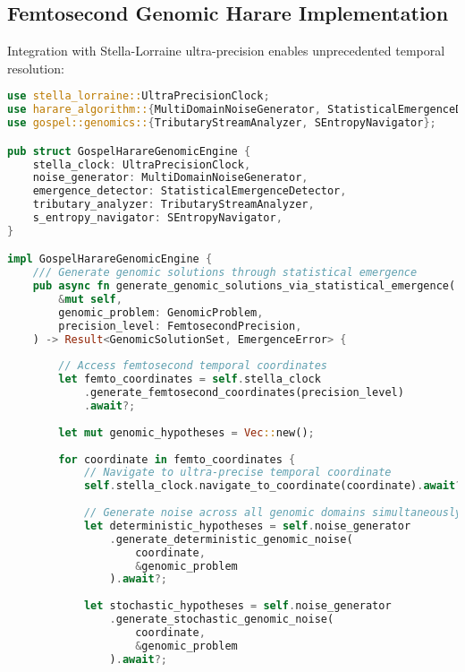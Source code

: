 \documentclass[12pt,a4paper]{article}
\begin{document}
\subsection{Femtosecond Genomic Harare Implementation}

Integration with Stella-Lorraine ultra-precision enables unprecedented temporal resolution:

\begin{lstlisting}[language=Rust, caption=Gospel-Harare Femtosecond Genomic Engine]
use stella_lorraine::UltraPrecisionClock;
use harare_algorithm::{MultiDomainNoiseGenerator, StatisticalEmergenceDetector};
use gospel::genomics::{TributaryStreamAnalyzer, SEntropyNavigator};

pub struct GospelHarareGenomicEngine {
    stella_clock: UltraPrecisionClock,
    noise_generator: MultiDomainNoiseGenerator,
    emergence_detector: StatisticalEmergenceDetector,
    tributary_analyzer: TributaryStreamAnalyzer,
    s_entropy_navigator: SEntropyNavigator,
}

impl GospelHarareGenomicEngine {
    /// Generate genomic solutions through statistical emergence
    pub async fn generate_genomic_solutions_via_statistical_emergence(
        &mut self,
        genomic_problem: GenomicProblem,
        precision_level: FemtosecondPrecision,
    ) -> Result<GenomicSolutionSet, EmergenceError> {
        
        // Access femtosecond temporal coordinates
        let femto_coordinates = self.stella_clock
            .generate_femtosecond_coordinates(precision_level)
            .await?;
        
        let mut genomic_hypotheses = Vec::new();
        
        for coordinate in femto_coordinates {
            // Navigate to ultra-precise temporal coordinate
            self.stella_clock.navigate_to_coordinate(coordinate).await?;
            
            // Generate noise across all genomic domains simultaneously
            let deterministic_hypotheses = self.noise_generator
                .generate_deterministic_genomic_noise(
                    coordinate, 
                    &genomic_problem
                ).await?;
            
            let stochastic_hypotheses = self.noise_generator
                .generate_stochastic_genomic_noise(
                    coordinate,
                    &genomic_problem
                ).await?;
            

\end{lstlisting}
\end{document}
